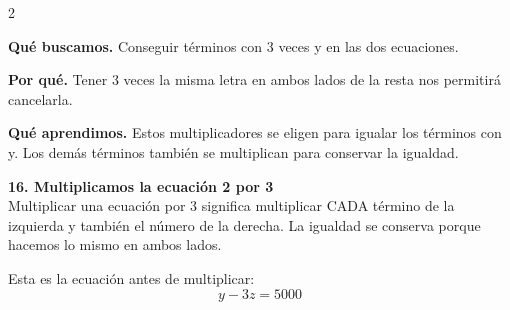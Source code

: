 \documentclass[11pt,a4paper,landscape]{article}
\begin{document}
\begin{multicols*}{2}
\begin{minipage}{\linewidth}
\par\smallskip\textbf{Qué buscamos.} Conseguir términos con 3 veces y en las dos ecuaciones.
\par\smallskip\textbf{Por qué.} Tener 3 veces la misma letra en ambos lados de la resta nos permitirá cancelarla.
\par{}\par\smallskip
\par\smallskip\textbf{Qué aprendimos.} Estos multiplicadores se eligen para igualar los términos con y. Los demás términos también se multiplican para conservar la igualdad.
\end{minipage}\par\medskip
\noindent\begin{minipage}{\linewidth}\textbf{16. Multiplicamos la ecuación 2 por 3}\\[2pt]Multiplicar una ecuación por 3 significa multiplicar CADA término de la izquierda y también el número de la derecha. La igualdad se conserva porque hacemos lo mismo en ambos lados.
\par\smallskip Esta es la ecuación antes de multiplicar:
\[y - 3z = 5000\]
\par{}\par\smallskip

\end{minipage}
\end{multicols*}
\end{document}
